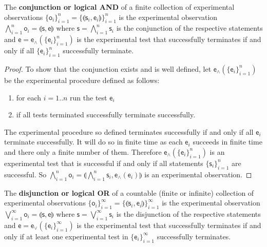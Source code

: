 \documentclass[11pt,letterpaper,fleqn]{memoir} %
\begin{document}
\begin{mathSection}
\begin{defn}
	The \textbf{conjunction or logical AND} of a finite collection  of experimental observations $\{\mathsf{o}_i\}_{i=1}^{n}=\{\llparenthesis \mathsf{s}_i, \mathsf{e}_i\rrparenthesis\}_{i=1}^{n}$ is the experimental observation $\bigwedge\limits_{i=1}^{n} \mathsf{o}_i = \llparenthesis \mathsf{s}, \mathsf{e}\rrparenthesis$ where $\mathsf{s} = \bigwedge\limits_{i=1}^{n} \mathsf{s}_i$ is the conjunction of the respective statements and $\mathsf{e} = \mathsf{e}_\wedge(\{\mathsf{e}_i\}_{i=1}^{n})$ is the experimental test that successfully terminates if and only if all $\{\mathsf{e}_i\}_{i=1}^{n}$ successfully terminate.
\end{defn}

\begin{proof}
	To show that the conjunction exists and is well defined, let $\mathsf{e}_\wedge(\{\mathsf{e}_i\}_{i=1}^{n})$ be the experimental procedure defined as follows:
	\begin{enumerate}
	\item for each $i=1..n$ run the test $\mathsf{e}_i$
	\item if all tests terminated successfully terminate successfully.
	\end{enumerate}
	The experimental procedure so defined terminates successfully if and only if all $\mathsf{e}_i$ terminate successfully. It will do so in finite time as each $\mathsf{e}_i$ succeeds in finite time and there only a finite number of them. Therefore $\mathsf{e}_\wedge(\{\mathsf{e}_i\}_{i=1}^{n})$ is an experimental test that is successful if and only if all statements $\{\mathsf{s}_i\}_{i=1}^{n}$ are successful. So $\bigwedge\limits_{i=1}^{n} \mathsf{o}_i = \llparenthesis\bigwedge\limits_{i=1}^{n} \mathsf{s}_i, \mathsf{e}_{\wedge}(\mathsf{e}_i)\rrparenthesis$ is an experimental observation.
\end{proof}

\begin{defn}
	The \textbf{disjunction or logical OR} of a countable (finite or infinite) collection of experimental observations $\{\mathsf{o}_i\}_{i=1}^{\infty}=\{\llparenthesis \mathsf{s}_i, \mathsf{e}_i\rrparenthesis\}_{i=1}^{\infty}$ is the experimental observation $\bigvee\limits_{i=1}^{\infty} \mathsf{o}_i = \llparenthesis \mathsf{s}, \mathsf{e}\rrparenthesis$ where $\mathsf{s} = \bigvee\limits_{i=1}^{\infty} \mathsf{s}_i$ is the disjunction of the respective statements and $\mathsf{e} = \mathsf{e}_\vee(\{\mathsf{e}_i\}_{i=1}^{\infty})$ is the experimental test that successfully terminates if and only if at least one experimental test in $\{\mathsf{e}_i\}_{i=1}^{\infty}$ successfully terminates.
\end{defn}


\end{mathSection}
\end{document}
